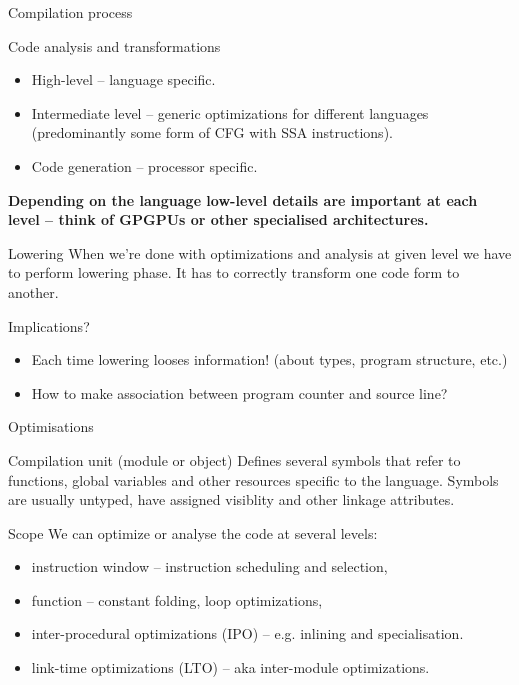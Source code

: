 \documentclass[8pt]{beamer}
\begin{document}
\begin{frame}{Compilation process}

  \begin{block}{Code analysis and transformations}
    \begin{itemize}
      \item High-level -- language specific.
      \item Intermediate level -- generic optimizations for different languages
        (predominantly some form of CFG with SSA instructions).
      \item Code generation -- processor specific.
    \end{itemize}
    \textbf{Depending on the language low-level details are important at each
      level -- think of GPGPUs or other specialised architectures.}
  \end{block}

  \begin{block}{Lowering}
    When we're done with optimizations and analysis at given level we have to
    perform lowering phase. It has to correctly transform one code form to
    another.
  \end{block}

  \begin{alertblock}{Implications?}
    \begin{itemize}
      \item Each time lowering looses information! (about types, program
        structure, etc.)
      \item How to make association between program counter and source line?
    \end{itemize}
  \end{alertblock}
\end{frame}

\begin{frame}{Optimisations}
  \begin{block}{Compilation unit (module or object)}
    Defines several symbols that refer to functions, global variables and other
    resources specific to the language. Symbols are usually untyped, have
    assigned visiblity and other linkage attributes.
  \end{block}

  \begin{block}{Scope}
    We can optimize or analyse the code at several levels:
    \begin{itemize}
      \item instruction window -- instruction scheduling and selection,
      \item function -- constant folding, loop optimizations,
      \item inter-procedural optimizations (IPO) -- e.g. inlining and specialisation.
      \item link-time optimizations (LTO) -- aka inter-module optimizations.
    \end{itemize}
  \end{block}
\end{frame}
\end{document}

